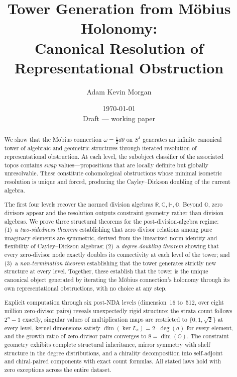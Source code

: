 \documentclass[12pt,a4paper]{article}
\title{Tower Generation from M\"{o}bius Holonomy:\\
Canonical Resolution of Representational Obstruction}
\author{Adam Kevin Morgan}
\date{\today \\ {\small Draft --- working paper}}
\theoremstyle{definition}
\theoremstyle{remark}
\newcommand{\R}{\mathbb{R}}
\newcommand{\C}{\mathbb{C}}
\newcommand{\HH}{\mathbb{H}}
\newcommand{\OO}{\mathbb{O}}
\begin{document}
\maketitle

\begin{abstract}
We show that the M\"{o}bius connection $\omega = \tfrac{1}{2}d\theta$
on $S^1$ generates an infinite canonical tower of algebraic and
geometric structures through iterated resolution of representational
obstruction. At each level, the subobject classifier of the
associated topos contains \emph{swap} values---propositions that are
locally definite but globally unresolvable. These constitute
cohomological obstructions whose minimal isometric resolution is
unique and forced, producing the Cayley--Dickson doubling of the
current algebra.

The first four levels recover the normed division algebras
$\R, \C, \HH, \OO$. Beyond $\OO$, zero divisors appear and the
resolution outputs constraint geometry rather than division algebras.
We prove three structural theorems for the post-division-algebra
regime: (1)~a \emph{two-sidedness theorem} establishing that zero
divisor relations among pure imaginary elements are symmetric, derived
from the linearized norm identity and flexibility of Cayley--Dickson
algebras; (2)~a \emph{degree-doubling theorem} showing that every
zero-divisor node exactly doubles its connectivity at each level of
the tower; and (3)~a \emph{non-termination theorem} establishing
that the tower generates strictly new structure at every level.
Together, these establish that the tower is the unique canonical
object generated by iterating the M\"{o}bius connection's holonomy
through its own representational obstructions, with no choice at
any step.

Explicit computation through six post-NDA levels (dimension~16
to~512, over eight million zero-divisor pairs) reveals
unexpectedly rigid structure: the strata count follows
$2^n - 1$ exactly, singular values of multiplication maps are
restricted to $\{0, 1, \sqrt{2}\}$ at every level, kernel
dimensions satisfy $\dim(\ker L_a) = 2 \cdot \deg(a)$ for every
element, and the growth ratio of zero-divisor pairs converges to
$8 = \dim(\OO)$. The constraint geometry exhibits complete
structural inheritance, mirror symmetry with shelf structure
in the degree distributions, and a chirality decomposition into
self-adjoint and chiral-paired components with exact count
formulas. All stated laws hold with zero exceptions across the
entire dataset.


\end{abstract}
\end{document}
